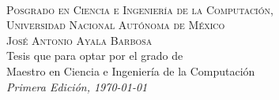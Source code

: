~\vfill
\thispagestyle{empty}

\noindent \textsc{Posgrado en Ciencia e Ingeniería de la Computación,\\ Universidad Nacional Autónoma de México}\\

\noindent \textsc{José Antonio Ayala Barbosa}\\

\noindent Tesis que para optar por el grado de \\
Maestro en Ciencia e Ingeniería de la Computación\\
\noindent \textit{Primera Edición, \today}

